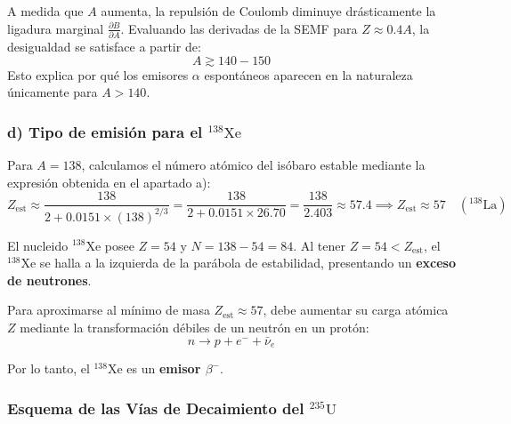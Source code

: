 \begin{problema}
A medida que $A$ aumenta, la repulsión de Coulomb diminuye drásticamente la ligadura marginal $\frac{\partial B}{\partial A}$. Evaluando las derivadas de la SEMF para $Z \approx 0.4 A$, la desigualdad se satisface a partir de:
\begin{equation}
A \gtrsim 140 - 150
\end{equation}
Esto explica por qué los emisores $\alpha$ espontáneos aparecen en la naturaleza únicamente para $A > 140$.

\subsubsection*{d) Tipo de emisión para el ${}^{138}\text{Xe}$}

Para $A = 138$, calculamos el número atómico del isóbaro estable mediante la expresión obtenida en el apartado a):
\begin{equation}
Z_{\text{est}} \approx \frac{138}{2 + 0.0151 \times (138)^{2/3}} = \frac{138}{2 + 0.0151 \times 26.70} = \frac{138}{2.403} \approx 57.4 \implies Z_{\text{est}} \approx 57 \quad ({}^{138}\text{La})
\end{equation}

El nucleido ${}^{138}\text{Xe}$ posee $Z = 54$ y $N = 138 - 54 = 84$. Al tener $Z = 54 < Z_{\text{est}}$, el ${}^{138}\text{Xe}$ se halla a la izquierda de la parábola de estabilidad, presentando un \textbf{exceso de neutrones}.

Para aproximarse al mínimo de masa $Z_{\text{est}} \approx 57$, debe aumentar su carga atómica $Z$ mediante la transformación débiles de un neutrón en un protón:
\begin{equation}
n \longrightarrow p + e^- + \bar{\nu}_e
\end{equation}

Por lo tanto, el ${}^{138}\text{Xe}$ es un \textbf{emisor $\beta^-$}.

\subsubsection*{Esquema de las Vías de Decaimiento del ${}^{235}\text{U}$}

\begin{center}
\end{center}
\end{problema}
